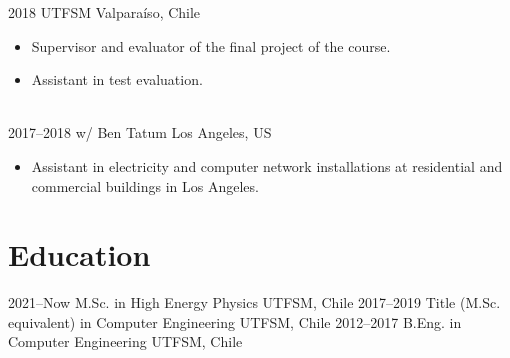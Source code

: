 \documentclass[a4paper]{cv-style}
\begin{document}
    \begin{entrylist}
        \entry
            {2018}
            {UTFSM}
            {Valpara\'iso, Chile}
            {
            \begin{itemize}
                \item Supervisor and evaluator of the final project of the course.
                \item Assistant in test evaluation.
            \end{itemize}} \\
        \entry
            {2017--2018}
            {w/ Ben Tatum}
            {Los Angeles, US}
            {
            \begin{itemize}
                \item Assistant in electricity and computer network installations at residential and commercial buildings in Los Angeles.
            \end{itemize}}
    \end{entrylist}

\section{Education}
    \begin{entrylist}
        \entry
            {2021--Now}
            {M.Sc. {\normalfont in High Energy Physics}}
            {UTFSM, Chile}
            {\vspace{-0.3cm}}
        \entry
            {2017--2019}
            {Title (M.Sc. equivalent) {\normalfont in Computer Engineering}}
            {UTFSM, Chile}
            {\vspace{-0.3cm}}
        \entry
            {2012--2017}
            {B.Eng. {\normalfont in Computer Engineering}}
            {UTFSM, Chile}
            {\vspace{-0.3cm}}
    \end{entrylist}

\end{document}
